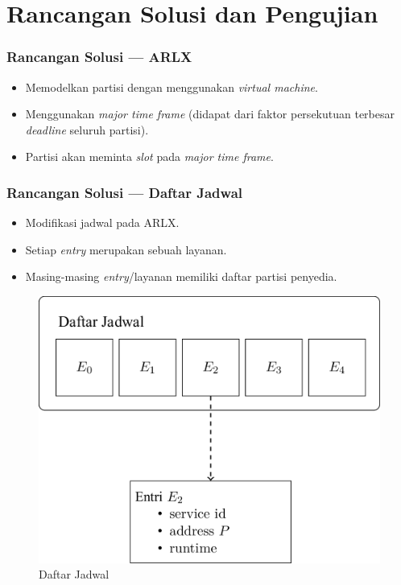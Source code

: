 \documentclass[xetex]{beamer}
\begin{document}
\section{Rancangan Solusi dan Pengujian}
\begin{frame}
	\frametitle{Rancangan Solusi --- ARLX}
	\begin{itemize}
		\item Memodelkan partisi dengan menggunakan \textit{virtual machine}.
		\item Menggunakan \textit{major time frame} (didapat dari faktor persekutuan
			terbesar \textit{deadline} seluruh partisi).
		\item Partisi akan meminta \textit{slot} pada \textit{major time frame}.
	\end{itemize}
\end{frame}
\begin{frame}
	\frametitle{Rancangan Solusi --- Daftar Jadwal}
	\begin{itemize}
		\item Modifikasi jadwal pada ARLX.
		\item Setiap \textit{entry} merupakan sebuah layanan.
		\item Masing-masing \textit{entry}/layanan memiliki daftar partisi penyedia.
	\end{itemize}
	\centering
	\begin{figure}
		\includegraphics[scale=0.15]{./final-project-figure0.png}
		\caption{Daftar Jadwal}
	\end{figure}
\end{frame}
\end{document}
